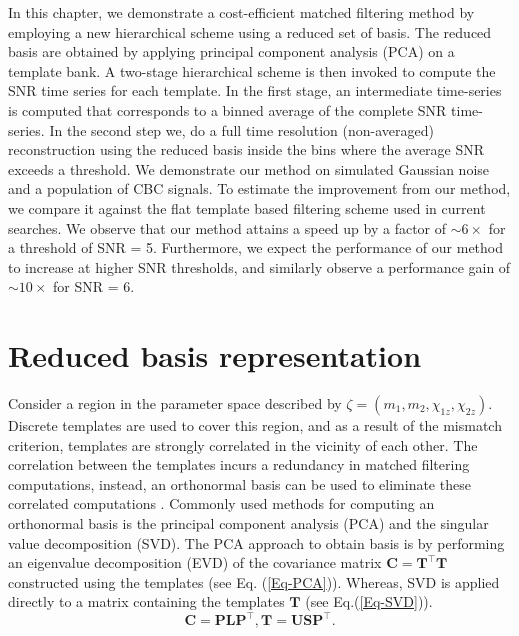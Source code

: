 In this chapter, we demonstrate a cost-efficient matched filtering method by employing a new hierarchical scheme using a reduced set of basis. The reduced basis are obtained by applying principal component analysis (PCA) on a template bank. A two-stage hierarchical scheme is then invoked to compute the SNR time series for each template. In the first stage, an intermediate time-series is computed that corresponds to a binned average of the complete SNR time-series. In the second step we, do a full time resolution (non-averaged) reconstruction using the reduced basis inside the bins where the average SNR exceeds a threshold. We demonstrate our method on simulated Gaussian noise and a population of CBC signals. To estimate the improvement from our method, we compare it against the flat template based filtering scheme used in current searches. We observe that our method attains a speed up by a factor of $\sim 6\times$ for a threshold of SNR = 5. Furthermore, we expect the performance of our method to increase at higher SNR thresholds, and similarly observe a performance gain of $\sim 10\times$ for SNR = 6. 

\section{Reduced basis representation}
Consider a region in the parameter space described by $\zeta = (m_1, m_2, \chi_{1z}, \chi_{2z})$. Discrete templates are used to cover this region, and as a result of the mismatch criterion, templates are strongly correlated in the vicinity of each other. The correlation between the templates incurs a redundancy in matched filtering computations, instead, an orthonormal basis can be used to eliminate these correlated computations \cite{SVD_initial}. Commonly used methods for computing an orthonormal basis is the principal component analysis (PCA) and the singular value decomposition (SVD). The PCA approach to obtain basis is by performing an eigenvalue decomposition (EVD) of the covariance matrix $\textbf{C} = \textbf{T}^{\top}\textbf{T}$ constructed using the templates (see Eq. (\ref{Eq-PCA})). Whereas, SVD is applied directly to a matrix containing the templates $\textbf{T}$ (see Eq.(\ref{Eq-SVD})). 
\begin{subequations}
  \begin{equation}
    \label{Eq-PCA}
      \textbf{C} = \textbf{PL}\textbf{P}^{\top},
  \end{equation}
  \begin{equation}
    \label{Eq-SVD}
    \textbf{T} = \textbf{US}\textbf{P}^{\top}.
  \end{equation}
\end{subequations}

